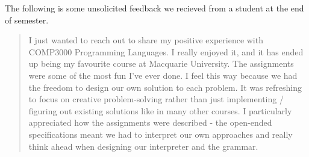 \documentclass[twoside=false,DIV=14]{scrartcl}
\begin{document}
The following is some unsolicited feedback we recieved from a student at the end of semester.
\begin{quote}
I just wanted to reach out to share my positive experience with COMP3000 Programming Languages. I really enjoyed it, and it has ended up being my favourite course at Macquarie University.
The assignments were some of the most fun I've ever done. I feel this way because we had the freedom to design our own solution to each problem. It was refreshing to focus on creative problem-solving rather than just implementing / figuring out existing solutions like in many other courses.
I particularly appreciated how the assignments were described - the open-ended specifications meant we had to interpret our own approaches and really think ahead when designing our interpreter and the grammar.
\end{quote}
\end{document}
